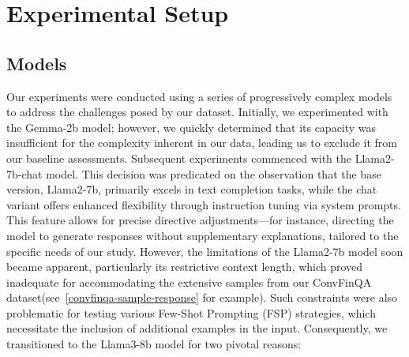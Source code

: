 \documentclass[logo,msc]{infthesis}           %
\begin{document}
\section{Experimental Setup}


\subsection{Models}
\begin{comment}
We experimented with the following models:
\begin{itemize}
\item Llama2-7B chat (baseline and fine-tuned)
\item Llama3-8B (baseline and fine-tuned)
\item Llama3.1-8b (baseline) 
\item Llama3.1-8b-instruct (baseline)
\end{itemize}
\end{comment}
Our experiments were conducted using a series of progressively complex models to address the challenges posed by our dataset. Initially, we experimented with the Gemma-2b model; however, we quickly determined that its capacity was insufficient for the complexity inherent in our data, leading us to exclude it from our baseline assessments. Subsequent experiments commenced with the Llama2-7b-chat model. This decision was predicated on the observation that the base version, Llama2-7b, primarily excels in text completion tasks, while the chat variant offers enhanced flexibility through instruction tuning via system prompts. This feature allows for precise directive adjustments—for instance, directing the model to generate responses without supplementary explanations, tailored to the specific needs of our study. However, the limitations of the Llama2-7b model soon became apparent, particularly its restrictive context length, which proved inadequate for accommodating the extensive samples from our ConvFinQA dataset(see~\ref{convfinqa-sample-response} for example). Such constraints were also problematic for testing various Few-Shot Prompting (FSP) strategies, which necessitate the inclusion of additional examples in the input. Consequently, we transitioned to the Llama3-8b model for two pivotal reasons:
\end{document}
